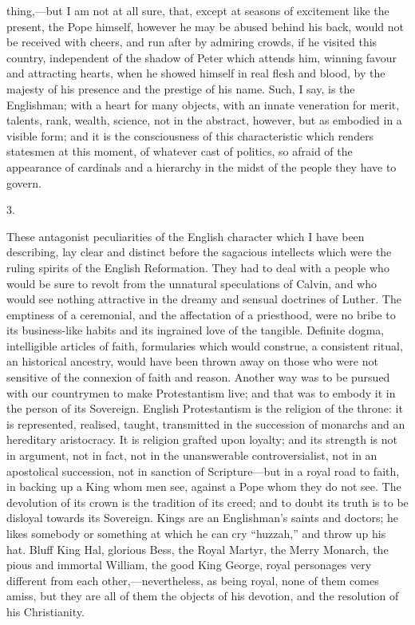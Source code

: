 thing,—but I am not at all sure, that, except at
seasons of excitement like the present, the Pope himself,
however he may be abused behind his back, would not be
received with cheers, and run after by admiring crowds,
if he visited this country, independent of the shadow of
Peter which attends him, winning favour and attracting
hearts, when he showed himself in real flesh and blood,
by the majesty of his presence and the prestige of his
name. Such, I say, is the Englishman; with a heart for
many objects, with an innate veneration for merit,
talents, rank, wealth, science, not in the abstract,
however, but as embodied in a visible form; and it is the
consciousness of this characteristic which renders
statesmen at this moment, of whatever cast of politics,
so afraid of the appearance of cardinals and a hierarchy
in the midst of the people they have to govern.

3.

These antagonist peculiarities of the English
character which I have been describing, lay clear and
distinct before the sagacious intellects which were the
ruling spirits of the English Reformation. They had to
deal with a people who would be sure to revolt from the
unnatural speculations of Calvin, and who would see
nothing attractive in the dreamy and sensual doctrines of
Luther. The emptiness of a ceremonial, and the
affectation of a priesthood, were no bribe to its
business-like habits and its ingrained love of the
tangible. Definite dogma, intelligible articles of faith,
formularies which would construe, a consistent ritual, an
historical ancestry, would have been thrown away on those
who were not sensitive of the connexion of faith and
reason. Another way was to be pursued with our countrymen
to make Protestantism live; and that was to embody it in
the person of its Sovereign. English Protestantism is the
religion of the throne: it is represented, realised,
taught, transmitted in the succession of monarchs and an
hereditary aristocracy. It is religion grafted upon
loyalty; and its strength is not in argument, not in
fact, not in the unanswerable controversialist, not in an
apostolical succession, not in sanction of
Scripture—but in a royal road to faith, in backing
up a King whom men see, against a Pope whom they do not
see. The devolution of its crown is the tradition of its
creed; and to doubt its truth is to be disloyal towards
its Sovereign. Kings are an Englishman's saints and
doctors; he likes somebody or something at which he can
cry ``huzzah,'' and throw up his hat. Bluff King
Hal, glorious Bess, the Royal Martyr, the Merry Monarch,
the pious and immortal William, the good King George,
royal personages very different from each
other,—nevertheless, as being royal, none of them
comes amiss, but they are all of them the objects of his
devotion, and the resolution of his Christianity.

